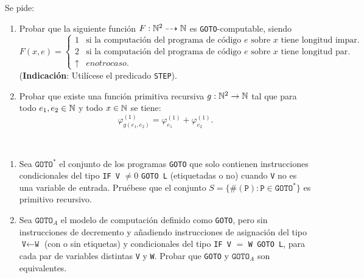 \documentclass[twoside]{article}
\begin{document}
\newpage

\begin{ejercicio}{2}
Se pide:
\begin{enumerate}
\item Probar que la siguiente función $F : \mathbb{N}^2\dashrightarrow \mathbb{N}$ es \texttt{GOTO}-computable, siendo
\[
F(x,e)=\begin{cases}
1 & \text{si la computación del programa de código }e\text{ sobre }x\text{ tiene longitud impar}.\\
2 & \text{si la computación del programa de código }e\text{ sobre }x\text{ tiene longitud par}.\\
\uparrow & en otro caso.
\end{cases}
\]
(\textbf{Indicación}: Utilícese el predicado \texttt{STEP}).
\item Probar que existe una función primitiva recursiva $g : \mathbb{N}^2 \to \mathbb{N}$ tal que para todo
$e_1, e_2 \in \mathbb{N}$ y todo $x \in \mathbb{N}$ se tiene:
$$\varphi_{g(e_1,e_2)}^{(1)}=\varphi_{e_1}^{(1)}+\varphi_{e_2}^{(1)}.$$
\end{enumerate}
\end{ejercicio}
\begin{solucion}
\end{solucion}

\newpage

\begin{ejercicio}{3}
\end{ejercicio}\
\begin{enumerate}
\item Sea $\texttt{GOTO}^*$ el conjunto de los programas \texttt{GOTO} que solo contienen instrucciones condicionales
del tipo \texttt{IF V} $\neq 0$ \texttt{GOTO L} (etiquetadas o no) cuando \texttt{V} no es una variable de
entrada. Pruébese que el conjunto $S = \{\#(\texttt{P}) : \texttt{P} \in \texttt{GOTO}^*\}$ es primitivo recursivo.

\item Sea $\texttt{GOTO}_A$ el modelo de computación definido como \texttt{GOTO}, pero sin instrucciones de
decremento y añadiendo instrucciones de asignación del tipo $\texttt{V}\leftarrow \texttt{W}$ (con o sin etiquetas)
y condicionales del tipo \texttt{IF V} $=$ \texttt{W GOTO L}, para cada par de variables distintas \texttt{V} y \texttt{W}.
Probar que \texttt{GOTO} y $\texttt{GOTO}_A$ son equivalentes.
\end{enumerate}
\begin{solucion}
\end{solucion}
\end{document}
